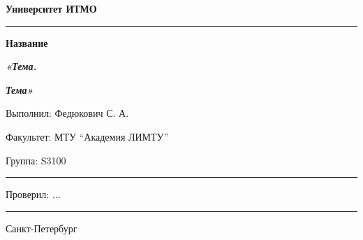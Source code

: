 \documentclass[12pt]{article}
\begin{document}
\pagestyle{empty}
\begin{center}
\large{\textbf{Университет ИТМО}}
\end{center}
\rule{500pt}{1pt}
\par\bigskip\par\bigskip\par\bigskip\par\bigskip\par\bigskip\par\bigskip\par\bigskip\par\bigskip
\begin{center}
\Large
\textbf{Название}

\textbf{\textit{«Тема.}}

\textbf{\textit{Тема»}}
\end{center}
\par\bigskip\par\bigskip\par\bigskip\par\bigskip\par\bigskip\par\bigskip\par\bigskip\par\bigskip\par\bigskip\par\bigskip\par\bigskip\par\bigskip\par\bigskip\par\bigskip      
\begin{flushright}
\large
Выполнил: Федюкович С. А.
\par\bigskip
Факультет: МТУ “Академия ЛИМТУ”
\par\bigskip
Группа: S3100                       
\par\bigskip\par\bigskip\par\bigskip

\rule{150pt}{0.5pt}
\par\bigskip\par\bigskip\par\bigskip\par\bigskip                                                            
 Проверил: ...
\par\bigskip \par\bigskip

\rule{150pt}{0.5pt}
\end{flushright}
\par\bigskip\par\bigskip\par\bigskip\par\bigskip\par\bigskip\par\bigskip\par\bigskip\par\bigskip\par\bigskip\par\bigskip     
\begin{center}
\large
Санкт-Петербург
\par{}
\end{center}
\newpage
\end{document}
